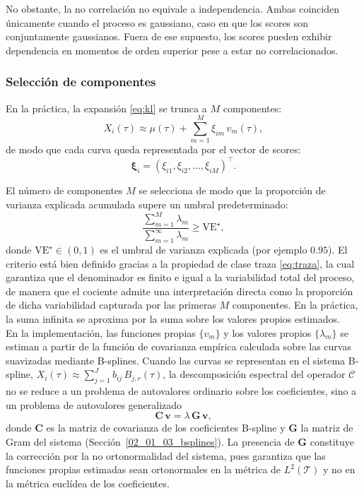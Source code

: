 No obstante, la no correlación no equivale a independencia. Ambas coinciden únicamente cuando el proceso es gaussiano, caso en que los scores son conjuntamente gaussianos. Fuera de ese supuesto, los scores pueden exhibir dependencia en momentos de orden superior pese a estar no correlacionados.

\subsubsection{Selección de componentes}
\label{02_01_04_03_truncamiento_componentes}
En la práctica, la expansión \eqref{eq:kl} se trunca a $M$ componentes:
\begin{equation}\label{eq:kl_truncada}
    X_i(\tau) \approx \mu(\tau) +
    \sum_{m=1}^{M} \xi_{im}\, v_m(\tau),
\end{equation}
de modo que cada curva queda representada por el vector de scores:
\begin{equation}
    \boldsymbol{\xi}_i =
    (\xi_{i1}, \xi_{i2}, \dots, \xi_{iM})^\top.
\end{equation}

El número de componentes $M$ se selecciona de modo que la proporción de varianza explicada acumulada supere un umbral predeterminado:
\begin{equation}\label{eq:var_explicada}
    \frac{\sum_{m=1}^{M} \lambda_m}{\sum_{m=1}^{\infty} \lambda_m}
    \geq \mathrm{VE}^{\star},
\end{equation}
donde $\mathrm{VE}^{\star} \in (0,1)$ es el umbral de varianza explicada (por ejemplo $0.95$). El criterio está bien definido gracias a la propiedad de clase traza \eqref{eq:traza}, la cual garantiza que el denominador es finito e igual a la variabilidad total del proceso, de manera que el cociente admite una interpretación directa como la proporción de dicha variabilidad capturada por las primeras $M$ componentes. En la práctica, la suma infinita se aproxima por la suma sobre los valores propios estimados.\\

En la implementación, las funciones propias $\{v_m\}$ y los valores propios $\{\lambda_m\}$ se estiman a partir de la función de covarianza empírica calculada sobre las curvas suavizadas mediante B-splines. Cuando las curvas se representan en el sistema B-spline, $X_i(\tau) \approx \sum_{j=1}^{J} b_{ij}\, B_{j,r}(\tau)$, la descomposición espectral del operador $\mathcal{C}$ no se reduce a un problema de autovalores ordinario sobre los coeficientes, sino a un problema de autovalores generalizado
\begin{equation}\label{eq:eigen_generalizado}
    \mathbf{C}\,\mathbf{v} = \lambda\,\mathbf{G}\,\mathbf{v},
\end{equation}
donde $\mathbf{C}$ es la matriz de covarianza de los coeficientes B-spline y $\mathbf{G}$ la matriz de Gram del sistema (Sección~\ref{02_01_03_bsplines}). La presencia de $\mathbf{G}$ constituye la corrección por la no ortonormalidad del sistema, pues garantiza que las funciones propias estimadas sean ortonormales en la métrica de $L^2(\mathcal{T})$ y no en la métrica euclídea de los coeficientes.\\

